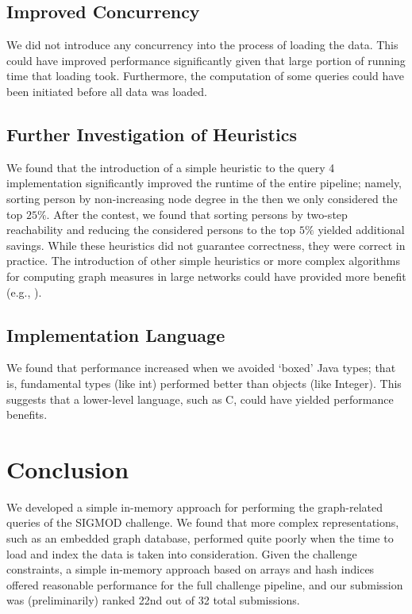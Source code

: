 \documentclass{article}
\begin{document}
\subsection{Improved Concurrency}
We did not introduce any concurrency into the process of loading the
data.  This could have improved performance significantly given that
large portion of running time that loading took.  Furthermore, the
computation of some queries could have been initiated before all data
was loaded.

\subsection{Further Investigation of Heuristics}
We found that the introduction of a simple heuristic to the query 4
implementation significantly improved the runtime of the entire
pipeline; namely, sorting person by non-increasing node degree in the
then we only considered the top $25\%$.  After the contest, we found
that sorting persons by two-step reachability and reducing the
considered persons to the top $5\%$ yielded additional savings.  While
these heuristics did not guarantee correctness, they were correct in
practice.  The introduction of other simple heuristics or more complex 
algorithms for computing graph measures in large networks 
could have provided more benefit (e.g., \cite{okamoto2008ranking,potamias2009fast}).

\subsection{Implementation Language}
We found that performance increased when we avoided `boxed' Java
types; that is, fundamental types (like int) performed better than
objects (like Integer).  This suggests that a lower-level language,
such as C, could have yielded performance benefits.

\section{Conclusion}
We developed a simple in-memory approach for performing the
graph-related queries of the SIGMOD challenge.  We found that more
complex representations, such as an embedded graph database, performed
quite poorly when the time to load and index the data is taken into
consideration.  Given the challenge constraints, a simple in-memory
approach based on arrays and hash indices offered reasonable
performance for the full challenge pipeline, and our submission was
(preliminarily) ranked 22nd out of 32 total submissions.
\end{document}
